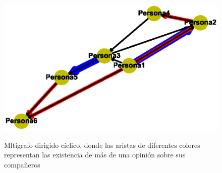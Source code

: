 \documentclass{article}
\begin{document}
\begin{center}

\end{center}
\begin{figure}[h]
\begin{center}
\includegraphics[scale=0.7]{Graf11.eps}\\
\caption{Mltigrafo dirigido cíclico, donde las aristas de diferentes colores representan las existencia de más de una opinión sobre sus compañeros}
\end{center}
\end{figure}
\end{document}
